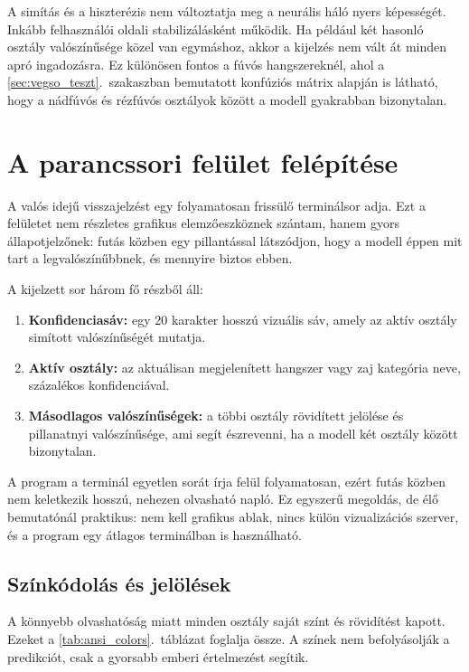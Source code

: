 A simítás és a hiszterézis nem változtatja meg a neurális háló nyers képességét. Inkább felhasználói oldali stabilizálásként működik. Ha például két hasonló osztály valószínűsége közel van egymáshoz, akkor a kijelzés nem vált át minden apró ingadozásra. Ez különösen fontos a fúvós hangszereknél, ahol a \ref{sec:vegso_teszt}.~szakaszban bemutatott konfúziós mátrix alapján is látható, hogy a nádfúvós és rézfúvós osztályok között a modell gyakrabban bizonytalan.

\section{A parancssori felület felépítése}
\label{sec:cli_dashboard}

A valós idejű visszajelzést egy folyamatosan frissülő terminálsor adja. Ezt a felületet nem részletes grafikus elemzőeszköznek szántam, hanem gyors állapotjelzőnek: futás közben egy pillantással látszódjon, hogy a modell éppen mit tart a legvalószínűbbnek, és mennyire biztos ebben.

A kijelzett sor három fő részből áll:
\begin{enumerate}
    \item \textbf{Konfidenciasáv:} egy 20 karakter hosszú vizuális sáv, amely az aktív osztály simított valószínűségét mutatja.
    \item \textbf{Aktív osztály:} az aktuálisan megjelenített hangszer vagy zaj kategória neve, százalékos konfidenciával.
    \item \textbf{Másodlagos valószínűségek:} a többi osztály rövidített jelölése és pillanatnyi valószínűsége, ami segít észrevenni, ha a modell két osztály között bizonytalan.
\end{enumerate}

A program a terminál egyetlen sorát írja felül folyamatosan, ezért futás közben nem keletkezik hosszú, nehezen olvasható napló. Ez egyszerű megoldás, de élő bemutatónál praktikus: nem kell grafikus ablak, nincs külön vizualizációs szerver, és a program egy átlagos terminálban is használható.

\subsection{Színkódolás és jelölések}

A könnyebb olvashatóság miatt minden osztály saját színt és rövidítést kapott. Ezeket a \ref{tab:ansi_colors}.~táblázat foglalja össze. A színek nem befolyásolják a predikciót, csak a gyorsabb emberi értelmezést segítik.

